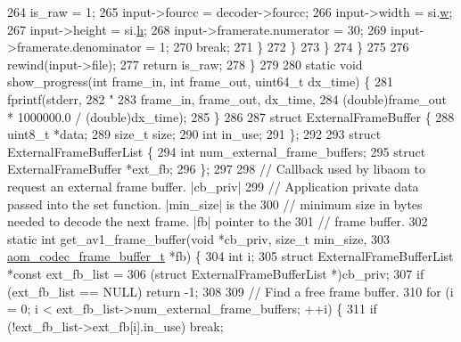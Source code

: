 \begin{DoxyCodeInclude}
{{{{{{{264           is\_raw = 1;
265           input->fourcc = decoder->fourcc;
266           input->width = si.\hyperlink{structaom__codec__stream__info_add84a2752fefd706f893fbc41ba6b9f2}{w};
267           input->height = si.\hyperlink{structaom__codec__stream__info_a2f1c33e3b980b274176545340b474e34}{h};
268           input->framerate.numerator = 30;
269           input->framerate.denominator = 1;
270           \textcolor{keywordflow}{break};
271         \}
272       \}
273     \}
274   \}
275 
276   rewind(input->file);
277   \textcolor{keywordflow}{return} is\_raw;
278 \}
279 
280 \textcolor{keyword}{static} \textcolor{keywordtype}{void} show\_progress(\textcolor{keywordtype}{int} frame\_in, \textcolor{keywordtype}{int} frame\_out, uint64\_t dx\_time) \{
281   fprintf(stderr,
282           \textcolor{stringliteral}{"%
283           frame\_in, frame\_out, dx\_time,
284           (\textcolor{keywordtype}{double})frame\_out * 1000000.0 / (\textcolor{keywordtype}{double})dx\_time);
285 \}
286 
287 \textcolor{keyword}{struct }ExternalFrameBuffer \{
288   uint8\_t *data;
289   \textcolor{keywordtype}{size\_t} size;
290   \textcolor{keywordtype}{int} in\_use;
291 \};
292 
293 \textcolor{keyword}{struct }ExternalFrameBufferList \{
294   \textcolor{keywordtype}{int} num\_external\_frame\_buffers;
295   \textcolor{keyword}{struct }ExternalFrameBuffer *ext\_fb;
296 \};
297 
298 \textcolor{comment}{// Callback used by libaom to request an external frame buffer. |cb\_priv|}
299 \textcolor{comment}{// Application private data passed into the set function. |min\_size| is the}
300 \textcolor{comment}{// minimum size in bytes needed to decode the next frame. |fb| pointer to the}
301 \textcolor{comment}{// frame buffer.}
302 \textcolor{keyword}{static} \textcolor{keywordtype}{int} get\_av1\_frame\_buffer(\textcolor{keywordtype}{void} *cb\_priv, \textcolor{keywordtype}{size\_t} min\_size,
303                                 \hyperlink{structaom__codec__frame__buffer}{aom\_codec\_frame\_buffer\_t} *fb) \{
304   \textcolor{keywordtype}{int} i;
305   \textcolor{keyword}{struct }ExternalFrameBufferList *\textcolor{keyword}{const} ext\_fb\_list =
306       (\textcolor{keyword}{struct }ExternalFrameBufferList *)cb\_priv;
307   \textcolor{keywordflow}{if} (ext\_fb\_list == NULL) \textcolor{keywordflow}{return} -1;
308 
309   \textcolor{comment}{// Find a free frame buffer.}
310   \textcolor{keywordflow}{for} (i = 0; i < ext\_fb\_list->num\_external\_frame\_buffers; ++i) \{
311     \textcolor{keywordflow}{if} (!ext\_fb\_list->ext\_fb[i].in\_use) \textcolor{keywordflow}{break};
}}}}}}}}
\end{DoxyCodeInclude}
